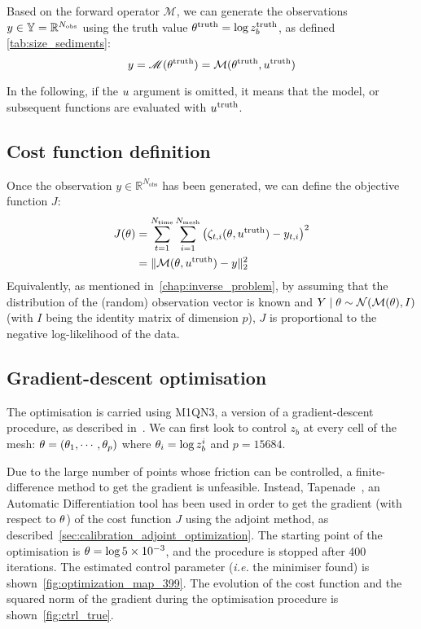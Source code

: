 \documentclass[../../Main_ManuscritThese.tex]{subfiles}
\newcommand{\zob}{z_b}
\begin{document}
Based on the forward operator $\mathscr{M}$, we can generate the
observations $y\in \mathbb{Y} = \mathbb{R}^{N_{\mathrm{obs}}}$ using the
truth value $\kk^{\mathrm{truth}}=\log \zob^{\mathrm{truth}}$, as
defined \cref{tab:size_sediments}:
\begin{equation}
  y = \mathscr{M}(\theta^{\mathrm{truth}}) = \mathcal{M}(\theta^{\mathrm{truth}}, u^{\mathrm{truth}})
\end{equation}

In the following, if the $u$ argument is omitted, it means that the
model, or subsequent functions are evaluated with
$u^{\mathrm{truth}}$.
\subsection{Cost function definition}
Once the observation $y \in \mathbb{R}^{N_{\mathrm{obs}}}$ has been generated, we can
define the objective function $J$:
\begin{align}
  \label{eq:cost_fun_definition}
  J(\theta) &= \sum_{t=1}^{ N_{\mathrm{time}}}\sum_{i=1}^{N_{\mathrm{mesh}}}  \left(\zeta_{t,i}(\theta,u^{\mathrm{truth}}) - y_{t, i}\right)^2 \\
         &= \|\mathcal{M}(\theta,u^{\mathrm{truth}}) - y\|_2^2
\end{align}
Equivalently, as mentioned in~\cref{chap:inverse_problem}, by assuming
that the distribution of the (random) observation vector is known and
$Y \mid \theta \sim \mathcal{N}(\mathcal{M}(\theta), I)$ (with $I$ being the
identity matrix of dimension $p$), $J$ is proportional to the negative
log-likelihood of the data.

\subsection{Gradient-descent optimisation}
\label{ssec:optim_gradient}
The optimisation is carried using M1QN3, a version of a
gradient-descent procedure, as described
in~\cite{gilbert_numerical_1989}. We can first look to control $\zob$
at every cell of the mesh: $\theta = (\theta_1,\cdots, \theta_p)$ where
$\kk_i = \log\zob^i$ and $p=\num{15684}$.

Due to the large number of points whose friction can be controlled, a
finite-difference method to get the gradient is unfeasible. Instead,
Tapenade~\citep{hascoet_tapenade_2013}, an Automatic Differentiation
tool has been used in order to get the gradient (with respect to
$\theta$) of the cost function $J$ using the adjoint method, as
described~\cref{sec:calibration_adjoint_optimization}. The starting
point of the optimisation is $\theta = \log \num{5e-3}$, and the
procedure is stopped after \num{400} iterations. The estimated control
parameter (\emph{i.e.} the minimiser found) is
shown~\cref{fig:optimization_map_399}.  The evolution of the cost
function and the squared norm of the gradient during the optimisation
procedure is shown~\cref{fig:ctrl_true}.
\end{document}
